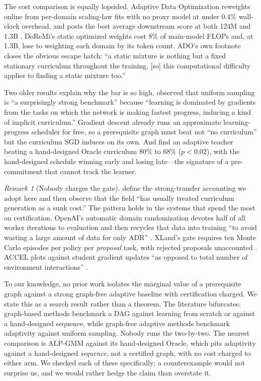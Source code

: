 \documentclass[11pt]{article}
\theoremstyle{plain}
\theoremstyle{definition}
\theoremstyle{remark}
\newtheorem*{remark}{Remark}
\begin{document}
The cost comparison is equally lopsided. Adaptive Data Optimization reweights
online from per-domain scaling-law fits with no proxy model at under $0.4\%$
wall-clock overhead, and posts the best average downstream score at both 124M and
1.3B \citep{jiang2025ado}. DoReMi's static optimized weights cost $8\%$ of
main-model FLOPs \citep{xie2023doremi} and, at 1.3B, lose to weighting each domain
by its token count. ADO's own footnote closes the obvious escape hatch: ``a
static mixture is nothing but a fixed stationary curriculum throughout the
training, [so] this computational difficulty applies to finding a static mixture
too.''

Two older results explain why the bar is so high. \citet{graves2017} observed
that uniform sampling is ``a surprisingly strong benchmark'' because
``learning is dominated by gradients from the tasks on which the network is
making fastest progress, inducing a kind of implicit curriculum.'' Gradient
descent already runs an approximate learning-progress scheduler for free, so a
prerequisite graph must beat not ``no curriculum'' but the curriculum SGD induces
on its own. And \citet{portelas2019teacher} find an adaptive teacher beating a
hand-designed Oracle curriculum $80\%$ to $68\%$ ($p < 0.02$), with the
hand-designed schedule winning early and losing late---the signature of a
pre-commitment that cannot track the learner.

\begin{remark}[Nobody charges the gate]
\citet{narvekar2020} define the strong-transfer accounting we adopt
here and then observe that the field ``has usually treated curriculum generation
as a sunk cost.'' The pattern holds in the systems that spend the most on
certification. OpenAI's automatic domain randomization devotes half of all worker
iterations to evaluation and then recycles that data into training ``to avoid
wasting a large amount of data for only ADR'' \citep{akkaya2019}. XLand's
gate requires ten Monte Carlo episodes per policy per \emph{proposal} task, with
rejected proposals unaccounted \citep{openended2021xland}. ACCEL plots against
student gradient updates ``as opposed to total number of environment
interactions'' \citep{parkerholder2022accel}.

To our knowledge, no prior work isolates the marginal value of a prerequisite
graph against a strong graph-free adaptive baseline with certification charged.
We state this as a search result rather than a theorem. The literature bifurcates:
graph-based methods \citep{svetlik2017,narvekar2020} benchmark
a DAG against learning from scratch or against a hand-designed sequence, while
graph-free adaptive methods \citep{graves2017,matiisen2020,%
portelas2019teacher,jiang2021} benchmark adaptivity against uniform sampling.
Nobody runs the two-by-two. The nearest comparison is ALP-GMM against its
hand-designed Oracle, which pits adaptivity against a hand-designed
\emph{sequence}, not a certified graph, with no cost charged to either arm. We
checked each of these specifically; a counterexample would not surprise us, and
we would rather hedge the claim than overstate it.
\end{remark}
\end{document}
